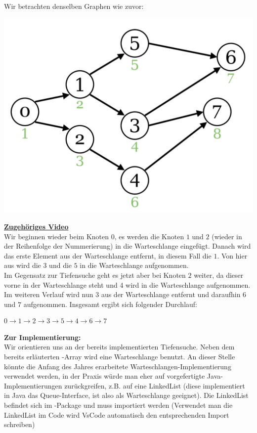 \documentclass{article}
\begin{document}
Wir betrachten denselben Graphen wie zuvor: 
\begin{center}
    \includegraphics[scale=0.15]{../../media/broad_search.png}
\end{center}
\href{https://youtu.be/pgRzRGii0F4}{\textbf{Zugehöriges Video}}\\
Wir beginnen wieder beim Knoten $0$, es werden die Knoten $1$ und $2$ (wieder in der Reihenfolge der Nummerierung) in die Warteschlange eingefügt. Danach wird das erste Element aus der Warteschlange entfernt, in diesem Fall die $1$. Von hier aus wird die $3$ und die $5$ in die Warteschlange aufgenommen. \\
Im Gegensatz zur Tiefensuche geht es jetzt aber bei Knoten $2$ weiter, da dieser vorne in der Warteschlange steht und 4 wird in die Warteschlange aufgenommen. Im weiteren Verlauf wird nun $3$ aus der Warteschlange entfernt und daraufhin $6$ und $7$ aufgenommen. Insgesamt ergibt sich folgender Durchlauf:
\begin{center}
    $0 \rightarrow 1 \rightarrow 2 \rightarrow 3 \rightarrow 5 \rightarrow 4 \rightarrow 6 \rightarrow 7$
\end{center}
\textbf{Zur Implementierung:} \\
Wir orientieren uns an der bereits implementierten Tiefensuche. Neben dem bereits erläuterten -Array wird eine Warteschlange benutzt. An dieser Stelle könnte die Anfang des Jahres erarbeitete Warteschlangen-Implementierung verwendet werden, in der Praxis würde man eher auf vorgefertigte Java-Implementierungen zurückgreifen, z.B. auf eine LinkedList (diese implementiert in Java das Queue-Interface, ist also als Warteschlange geeignet). Die LinkedList befindet sich im -Package und muss importiert werden (Verwendet man die LinkedList im Code wird VsCode automatisch den entsprechenden Import schreiben)
\end{document}

